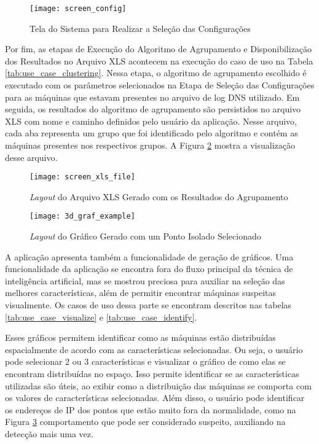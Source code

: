 \begin{figure}
\centering
\texttt{[image: screen\_config]}
\caption[Tela do Sistema para Realizar a Seleção das Configurações]{Tela do Sistema para Realizar a Seleção das Configurações} \label{fig:screen_config}
\end{figure}

Por fim, as etapas de Execução do Algoritmo de Agrupamento e Disponibilização dos Resultados no Arquivo XLS acontecem na execução do caso de uso na Tabela \ref{tab:use_case_clustering}. Nessa etapa, o algoritmo de agrupamento escolhido é executado com os parâmetros selecionados na Etapa de Seleção das Configurações para as máquinas que estavam presentes no arquivo de log DNS utilizado. Em seguida, os resultados do algoritmo de agrupamento são persistidos no arquivo XLS com nome e caminho definidos pelo usuário da aplicação. Nesse arquivo, cada aba representa um grupo que foi identificado pelo algoritmo e contém as máquinas presentes nos respectivos grupos. A Figura \ref{fig:screen_xls_file} mostra a visualização desse arquivo.

\begin{figure}
\centering
\texttt{[image: screen\_xls\_file]}
\caption[\textit{Layout} do Arquivo XLS Gerado com os Resultados do Agrupamento]{\textit{Layout} do Arquivo XLS Gerado com os Resultados do Agrupamento} \label{fig:screen_xls_file}
\end{figure}

\begin{figure}
\centering
\texttt{[image: 3d\_graf\_example]}
\caption[\textit{Layout}  do Gráfico Gerado com um Ponto Isolado Selecionado]{\textit{Layout}  do Gráfico Gerado com um Ponto Isolado Selecionado} \label{fig:3d_graf_example}
\end{figure}

A aplicação apresenta também a funcionalidade de geração de gráficos. Uma funcionalidade da aplicação se encontra fora do fluxo principal da técnica de inteligência artificial, mas se mostrou preciosa para auxiliar na seleção das melhores características, além de permitir encontrar máquinas suspeitas visualmente. Os casos de uso dessa parte se encontram descritos nas tabelas \ref{tab:use_case_visualize} e \ref{tab:use_case_identify}.

Esses gráficos permitem identificar como as máquinas estão distribuídas espacialmente de acordo com as características selecionadas. Ou seja, o usuário pode selecionar 2 ou 3 características e visualizar o gráfico de como elas se encontram distribuídas no espaço. Isso permite identificar se as características utilizadas são úteis, ao exibir como a distribuição das máquinas se comporta com os valores de características selecionadas. Além disso, o usuário pode identificar os endereços de IP dos pontos que estão muito fora da normalidade, como na Figura \ref{fig:3d_graf_example} comportamento que pode ser considerado suspeito, auxiliando na detecção mais uma vez.
